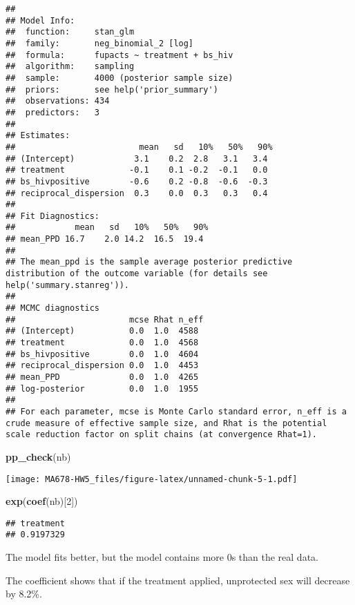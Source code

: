 \documentclass[
]{article}
\newenvironment{Shaded}{\begin{snugshade}}{\end{snugshade}}
\newcommand{\DecValTok}[1]{\textcolor[rgb]{0.00,0.00,0.81}{#1}}
\newcommand{\FunctionTok}[1]{\textcolor[rgb]{0.13,0.29,0.53}{\textbf{#1}}}
\newcommand{\NormalTok}[1]{#1}
\begin{document}
\begin{verbatim}
## 
## Model Info:
##  function:     stan_glm
##  family:       neg_binomial_2 [log]
##  formula:      fupacts ~ treatment + bs_hiv
##  algorithm:    sampling
##  sample:       4000 (posterior sample size)
##  priors:       see help('prior_summary')
##  observations: 434
##  predictors:   3
## 
## Estimates:
##                         mean   sd   10%   50%   90%
## (Intercept)            3.1    0.2  2.8   3.1   3.4 
## treatment             -0.1    0.1 -0.2  -0.1   0.0 
## bs_hivpositive        -0.6    0.2 -0.8  -0.6  -0.3 
## reciprocal_dispersion  0.3    0.0  0.3   0.3   0.4 
## 
## Fit Diagnostics:
##            mean   sd   10%   50%   90%
## mean_PPD 16.7    2.0 14.2  16.5  19.4 
## 
## The mean_ppd is the sample average posterior predictive distribution of the outcome variable (for details see help('summary.stanreg')).
## 
## MCMC diagnostics
##                       mcse Rhat n_eff
## (Intercept)           0.0  1.0  4588 
## treatment             0.0  1.0  4568 
## bs_hivpositive        0.0  1.0  4604 
## reciprocal_dispersion 0.0  1.0  4453 
## mean_PPD              0.0  1.0  4265 
## log-posterior         0.0  1.0  1955 
## 
## For each parameter, mcse is Monte Carlo standard error, n_eff is a crude measure of effective sample size, and Rhat is the potential scale reduction factor on split chains (at convergence Rhat=1).
\end{verbatim}

\begin{Shaded}
\begin{Highlighting}[]
\FunctionTok{pp\_check}\NormalTok{(nb)}
\end{Highlighting}
\end{Shaded}

\texttt{[image: MA678-HW5\_files/figure-latex/unnamed-chunk-5-1.pdf]}

\begin{Shaded}
\begin{Highlighting}[]
\FunctionTok{exp}\NormalTok{(}\FunctionTok{coef}\NormalTok{(nb)[}\DecValTok{2}\NormalTok{])}
\end{Highlighting}
\end{Shaded}

\begin{verbatim}
## treatment 
## 0.9197329
\end{verbatim}

The model fits better, but the model contains more 0s than the real
data.

The coefficient shows that if the treatment applied, unprotected sex
will decrease by 8.2\%.
\end{document}

